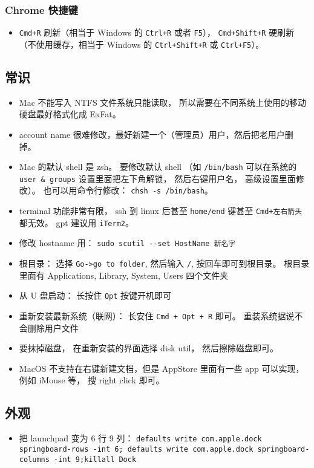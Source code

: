\subsubsection{Chrome 快捷键}
\begin{itemize}
\item \verb|Cmd+R| 刷新（相当于 Windows 的 \verb|Ctrl+R| 或者 \verb|F5|）， \verb|Cmd+Shift+R| 硬刷新（不使用缓存，相当于 Windows 的 \verb|Ctrl+Shift+R| 或 \verb|Ctrl+F5|）。
\end{itemize}

\subsection{常识}
\begin{itemize}
\item Mac 不能写入 NTFS 文件系统只能读取， 所以需要在不同系统上使用的移动硬盘最好格式化成 ExFat。
\item account name 很难修改，最好新建一个（管理员）用户，然后把老用户删掉。
\item Mac 的默认 shell 是 zsh。 要修改默认 shell （如 \verb|/bin/bash| 可以在系统的 \verb|user & groups| 设置里面把左下角解锁， 然后右键用户名， 高级设置里面修改）。 也可以用命令行修改： \verb|chsh -s /bin/bash|。
\item terminal 功能非常有限， ssh 到 linux 后甚至 \verb|home/end| 键甚至 \verb|Cmd+左右箭头| 都无效。 gpt 建议用 \verb|iTerm2|。
\item 修改 hostname 用： \verb|sudo scutil --set HostName 新名字|
\item 根目录： 选择 \verb|Go->go to folder|, 然后输入 \verb|/|, 按回车即可到根目录。 根目录里面有 Applications, Library, System, Users 四个文件夹
\item 从 U 盘启动： 长按住 \verb`Opt` 按键开机即可
\item 重新安装最新系统（联网）： 长安住 \verb|Cmd + Opt + R| 即可。 重装系统据说不会删除用户文件
\item 要抹掉磁盘， 在重新安装的界面选择 disk util， 然后擦除磁盘即可。
\item MacOS 不支持在右键新建文档，但是 AppStore 里面有一些 app 可以实现， 例如 iMouse 等， 搜 right click 即可。
\end{itemize}

\subsection{外观}
\begin{itemize}
\item 把 launchpad 变为 6 行 9 列： \verb`defaults write com.apple.dock springboard-rows -int 6; defaults write com.apple.dock springboard-columns -int 9;killall Dock`
\end{itemize}

